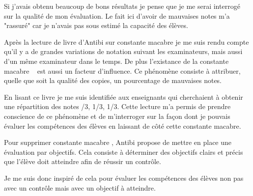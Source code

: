 Si j'avais obtenu beaucoup de bons résultats je pense que je me serai interrogé sur la qualité de mon évaluation.
Le fait ici d'avoir de mauvaises notes m'a "rassuré" car je n'avais pas sous estimé la capacité des élèves.

Après la lecture de livre d'Antibi sur \og constante macabre \fg je me suis rendu compte qu'il y a de grandes variations de notation suivant les examinateurs, mais aussi d'un même examinateur dans le temps.
De plus l'existance de la \og constante macabre \fg~\cite{antibi2003constante} est aussi un facteur d'influence.
Ce phénomène consiste à attribuer, quelle que soit la qualité des copies, un pourcentage de mauvaises notes.

En lisant ce livre je me suis identifiée aux enseignants qui cherchaient à obtenir une répartition des notes /3, 1/3, 1/3\fg.
Cette lecture m'a permis de prendre conscience de ce phénomène et de m'interroger sur la façon dont je pouvais évaluer les compétences des élèves en laissant de côté cette constante macabre.

Pour supprimer \og constante macabre \fg, Antibi propose de mettre en place une évaluation par objectifs.
Cela consiste à déterminer des objectifs clairs et précis que l'élève doit atteindre afin de réussir un contrôle.

Je me suis donc inspiré de cela pour évaluer les compétences des élèves non pas avec un contrôle mais avec un objectif à atteindre.
